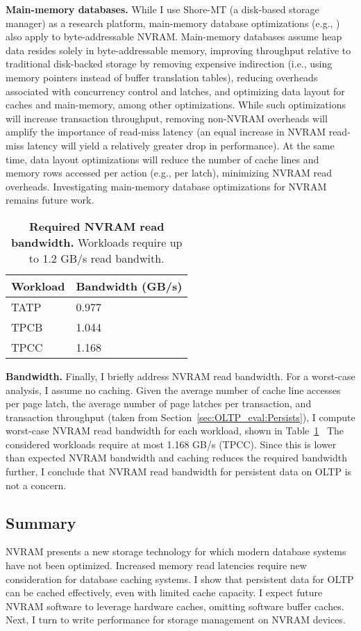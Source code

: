 \textbf{Main-memory databases.}
While I use Shore-MT (a disk-based storage manager) as a research platform, main-memory database optimizations (e.g., \cite{DiaconuFreedman13, BallardBehman11, Oracle09}) also apply to byte-addressable NVRAM.
Main-memory databas\-es assume heap data resides solely in byte-addressable memory, improving throughput relative to traditional disk-back\-ed storage by removing expensive indirection (i.e., using memory pointers instead of buffer translation tables), reducing overheads associated with concurrency control and latches, and optimizing data layout for caches and main-memory, among other optimizations.
While such optimizations will increase transaction throughput, removing non-NVRAM overheads will amplify the importance of read-miss latency (an equal increase in NVRAM read-miss latency will yield a relatively greater drop in performance).
At the same time, data layout optimizations will reduce the number of cache lines and memory rows accessed per action (e.g., per latch), minimizing NVRAM read overheads.
Investigating main-memory database optimizations for NVRAM remains future work.

\begin{table}
  \centering
  \begin{tabular}{l l}
    \hline
    Workload & Bandwidth (GB/s) \\
    \hline \hline
    TATP & 0.977 \\
    TPCB & 1.044 \\
    TPCC & 1.168 \\
    \hline
  \end{tabular}
  \caption{\textbf{Required NVRAM read bandwidth.} Workloads require up to 1.2 GB/s read bandwith.}
  \label{table::ReadBandwidth}
\end{table}

\textbf{Bandwidth.}
Finally, I briefly address NVRAM read bandwidth.
For a worst-case analysis, I assume no caching.
Given the average number of cache line accesses per page latch, the average number of page latches per transaction, and transaction throughput (taken from Section~\ref{sec:OLTP_eval:Persists}), I compute worst-case NVRAM read bandwidth for each workload, shown in Table~\ref{table::ReadBandwidth}~
The considered workloads require at most 1.168 GB/s (TPCC).
Since this is lower than expected NVRAM bandwidth and caching reduces the required bandwidth further, I conclude that NVRAM read bandwidth for persistent data on OLTP is not a concern.

\subsection{Summary}
\label{sec:OLTP_eval:Reads:Summary}
NVRAM presents a new storage technology for which modern database systems have not been optimized.
Increased memory read latencies require new consideration for database caching systems.
I show that persistent data for OLTP can be cached effectively, even with limited cache capacity.
I expect future NVRAM software to leverage hardware caches, omitting software buffer caches.
Next, I turn to write performance for storage management on NVRAM devices.

